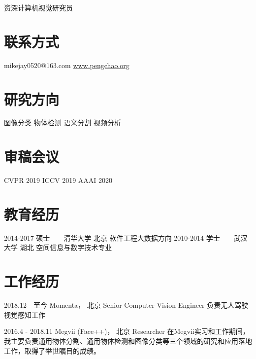 \documentclass[]{friggeri-cv}
\begin{document}
       {资深计算机视觉研究员}

\begin{aside}
  \section{联系方式}
    mikejay0520@163.com
    \href{http://www.pengchao.org}{www.pengchao.org}
  \section{研究方向}
    图像分类
    物体检测
    语义分割
    视频分析
  \section{审稿会议}
    CVPR 2019
    ICCV 2019
    AAAI 2020
\end{aside}

\section{教育经历}
\begin{entrylist}
  \entry
    {2014-2017}
    {硕士~~~~清华大学}
    {北京}
    {软件工程大数据方向}
  \entry
    {2010-2014}
    {学士~~~~武汉大学}
    {湖北}
    {空间信息与数字技术专业}
\end{entrylist}


\section{工作经历}
\begin{entrylist}
  \entry
    {2018.12 - 至今}
    {Momenta， 北京}
    {Senior Computer Vision Engineer}
    {负责无人驾驶视觉感知工作}

  \entry
    {2016.4 - 2018.11 \qquad }
    {Megvii (Face++)， 北京}
    {Researcher}
    {在Megvii实习和工作期间，我主要负责通用物体分割、通用物体检测和图像分类等三个领域的研究和应用落地工作，取得了举世瞩目的成绩。}

\end{entrylist}
\end{document}
